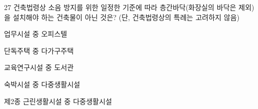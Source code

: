 \begin{question}{27}
건축법령상 소음 방지를 위한 일정한 기준에 따라 층간바닥(화장실의 바닥은 제외)을 설치해야 하는 건축물이 아닌 것은? (단, 건축법령상의 특례는 고려하지 않음)
\begin{choices}
  \item 업무시설 중 오피스텔
  \item 단독주택 중 다가구주택
  \item 교육연구시설 중 도서관
  \item 숙박시설 중 다중생활시설
  \item 제2종 근린생활시설 중 다중생활시설
\end{choices}
\end{question}
